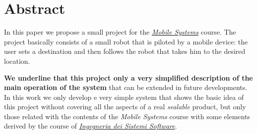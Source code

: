 \section*{Abstract}

In this paper we propose a small project for the \textit{\href{https://www.unibo.it/it/didattica/insegnamenti/insegnamento/2021/402283}{Mobile Systems}} course.
The project basically consists of a small robot that is piloted by a mobile device: the user sets a destination and then follows the robot that takes him to the desired location.

\textbf{We underline that this project only a very simplified description of the main operation of the system} that can be extended in future developments.
In this work we only develop e very simple system that shows the basic idea of this project without covering all the aspects of a real \textit{sealable} product, but only those related with the contents of the \textit{Mobile Systems} course with some elements derived by the course of \href{https://www.unibo.it/it/didattica/insegnamenti/insegnamento/2021/468003}{\textit{Ingegneria dei Sistemi Software}}.
